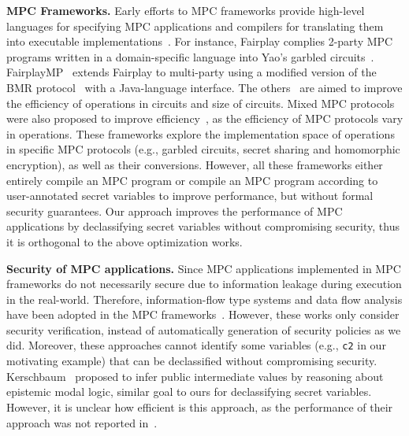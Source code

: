 \noindent
{\bf MPC Frameworks.}
Early efforts to MPC frameworks provide high-level languages for specifying MPC applications and compilers
for translating them into executable implementations~\cite{Fairplay04,Ben-DavidNP08,BogdanovLW08,DamgardGKN09,BurkhartSMD10,HolzerFKV12,SonghoriHS0K15,frigate16}.
For instance, Fairplay complies 2-party MPC programs written in a domain-specific language into
Yao's garbled circuits~\cite{Fairplay04}. FairplayMP~\cite{Ben-DavidNP08} extends
Fairplay to multi-party using a modified version of the BMR protocol~\cite{BeaverMR90} with a Java-language interface.
The others~\cite{BogdanovLW08,DamgardGKN09,BurkhartSMD10,HolzerFKV12,SonghoriHS0K15,frigate16}
are aimed to improve the efficiency of operations in circuits and size of circuits.
Mixed MPC protocols were also proposed to improve efficiency~\cite{HeneckaKSSW10,SchropferKM11,BogdanovLR14,RastogiHH14,LaudR15,Demmler0Z15,MohasselR18,hycc18,aby221}, as the efficiency of MPC protocols vary in operations.
These frameworks explore the implementation space of operations in specific MPC protocols (e.g., garbled circuits, secret sharing
and homomorphic encryption), as well as their conversions.
However, all these frameworks either entirely compile an MPC program
or compile an MPC program according to user-annotated secret variables to improve performance, but without formal security guarantees.
Our approach improves the performance of MPC applications by declassifying secret variables without compromising security,
thus it is orthogonal to the above optimization works.


\smallskip
\noindent
{\bf Security of MPC applications.}
Since MPC applications implemented in MPC frameworks do not necessarily secure
due to information leakage during execution in the real-world. Therefore,
information-flow type systems and data flow analysis have been adopted in the MPC frameworks~\cite{NielsenS07,Mitchell0SZ12,picco13,LiuHSKH14,LiuWNHS15,ZahurE15,ChandranGRST19,MPyC20,spdz20}.
However, these works only consider security verification, instead of
automatically generation of security policies as we did.
Moreover,
these approaches cannot identify some variables (e.g., {\tt c2} in our motivating example)
that can be declassified without compromising security.
Kerschbaum~\cite{Kerschbaum11} proposed to infer public intermediate values
by reasoning about epistemic modal logic, similar goal to ours for declassifying secret variables.
However, it is unclear how efficient is this approach, as the performance of their approach was
not reported in~\cite{Kerschbaum11}.



